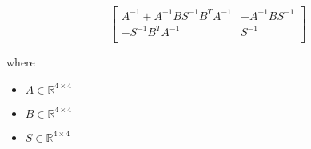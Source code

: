 \documentclass[12pt]{article}
\begin{document}
\[
\begin{bmatrix}
\textit{A}^{-1} + \textit{A}^{-1}\textit{B}\textit{S}^{-1}\textit{B}^T\textit{A}^{-1} & -\textit{A}^{-1}\textit{B}\textit{S}^{-1}\\
-\textit{S}^{-1}\textit{B}^T\textit{A}^{-1} & \textit{S}^{-1}\\
\end{bmatrix}
\]

where
\begin{itemize}
\item $\textit{A} \in \mathbb{R}^{ 4 \times 4 }$
\item $\textit{B} \in \mathbb{R}^{ 4 \times 4 }$
\item $\textit{S} \in \mathbb{R}^{ 4 \times 4 }$
\end{itemize}
\end{document}
